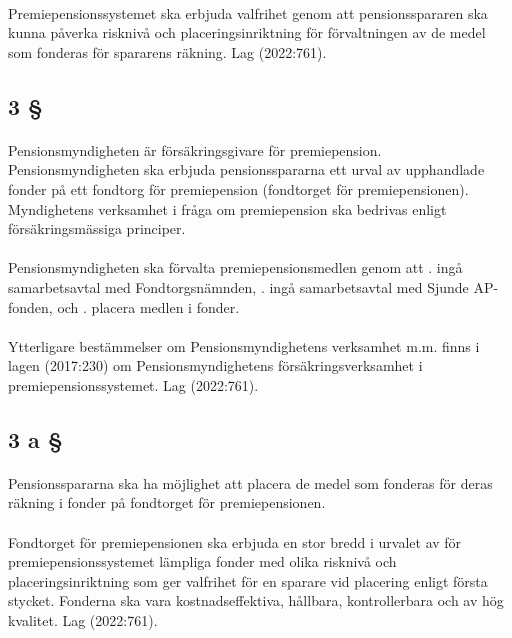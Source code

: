 \documentclass[a4paper,notitlepage,openany,10pt]{book}
\begin{document}
\paragraph*{}
Premiepensionssystemet ska erbjuda valfrihet genom att pensionsspararen ska kunna påverka risknivå och placeringsinriktning för förvaltningen av de medel som fonderas för spararens räkning.
Lag (2022:761).
\subsection*{3 §}
\paragraph*{}
Pensionsmyndigheten är försäkringsgivare för premiepension. Pensionsmyndigheten ska erbjuda pensionsspararna ett urval av upphandlade fonder på ett fondtorg för premiepension (fondtorget för premiepensionen). Myndighetens verksamhet i fråga om premiepension ska bedrivas enligt försäkringsmässiga principer.
\paragraph*{}
Pensionsmyndigheten ska förvalta premiepensionsmedlen genom att
. ingå samarbetsavtal med Fondtorgsnämnden,
. ingå samarbetsavtal med Sjunde AP-fonden, och
. placera medlen i fonder.
\paragraph*{}
Ytterligare bestämmelser om Pensionsmyndighetens verksamhet m.m. finns i lagen (2017:230) om Pensionsmyndighetens försäkringsverksamhet i premiepensionssystemet.
Lag (2022:761).
\subsection*{3 a §}
\paragraph*{}
Pensionsspararna ska ha möjlighet att placera de medel som fonderas för deras räkning i fonder på fondtorget för premiepensionen.
\paragraph*{}
Fondtorget för premiepensionen ska erbjuda en stor bredd i urvalet av för premiepensionssystemet lämpliga fonder med olika risknivå och placeringsinriktning som ger valfrihet för en sparare vid placering enligt första stycket. Fonderna ska vara kostnadseffektiva, hållbara, kontrollerbara och av hög kvalitet.
Lag (2022:761).
\end{document}
